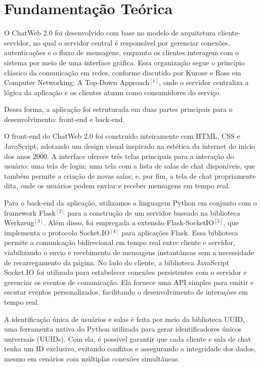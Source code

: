 \documentclass[conference,compsoc]{IEEEtran}
\begin{document}
\begin{otherlanguage}{brazil}
\section{Fundamentação Teórica}

O ChatWeb 2.0 foi desenvolvido com base no modelo de arquitetura cliente-servidor, no qual o servidor central é responsável por gerenciar conexões, autenticações e o fluxo de mensagens, enquanto os clientes interagem com o sistema por meio de uma interface gráfica. Essa organização segue o princípio clássico da comunicação em redes, conforme discutido por Kurose e Ross em Computer Networking: A Top-Down Approach$^{[1]}$, onde o servidor centraliza a lógica da aplicação e os clientes atuam como consumidores do serviço.

Dessa forma, a aplicação foi estruturada em duas partes principais para o desenvolvimento: front-end e back-end.

O front-end do ChatWeb 2.0 foi construído inteiramente com HTML, CSS e JavaScript, adotando um design visual inspirado na estética da internet do início dos anos 2000. A interface oferece três telas principais para a interação do usuário: uma tela de login; uma tela com a lista de salas de chat disponíveis, que também permite a criação de novas salas; e, por fim, a tela de chat propriamente dita, onde os usuários podem enviar e receber mensagens em tempo real.

Para o back-end da aplicação, utilizamos a linguagem Python em conjunto com o framework Flask$^{[2]}$ para a construção de um servidor baseado na biblioteca Werkzeug$^{[3]}$. Além disso, foi empregada a extensão Flask-SocketIO$^{[5]}$, que implementa o protocolo Socket.IO$^{[4]}$ para aplicações Flask. Essa biblioteca permite a comunicação bidirecional em tempo real entre cliente e servidor, viabilizando o envio e recebimento de mensagens instantâneas sem a necessidade de recarregamento da página. No lado do cliente, a biblioteca JavaScript Socket.IO foi utilizada para estabelecer conexões persistentes com o servidor e gerenciar os eventos de comunicação. Ela fornece uma API simples para emitir e escutar eventos personalizados, facilitando o desenvolvimento de interações em tempo real.

A identificação única de usuários e salas é feita por meio da biblioteca UUID, uma ferramenta nativa do Python utilizada para gerar identificadores únicos universais (UUIDs). Com ela, é possível garantir que cada cliente e sala de chat tenha um ID exclusivo, evitando conflitos e assegurando a integridade dos dados, mesmo em cenários com múltiplas conexões simultâneas.


\end{otherlanguage}
\end{document}
